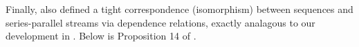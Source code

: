 Finally,  also defined a tight correspondence (isomorphism)
between sequences and series-parallel streams via dependence relations,
exactly analagous to our development in .
Below is Proposition 14 of .


